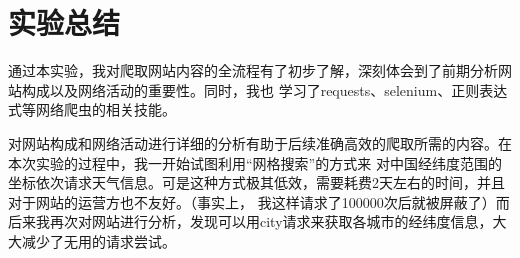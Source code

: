 \section{实验总结}
通过本实验，我对爬取网站内容的全流程有了初步了解，深刻体会到了前期分析网站构成以及网络活动的重要性。同时，我也
学习了requests、selenium、正则表达式等网络爬虫的相关技能。

对网站构成和网络活动进行详细的分析有助于后续准确高效的爬取所需的内容。在本次实验的过程中，我一开始试图利用“网格搜索”的方式来
对中国经纬度范围的坐标依次请求天气信息。可是这种方式极其低效，需要耗费2天左右的时间，并且对于网站的运营方也不友好。（事实上，
我这样请求了100000次后就被屏蔽了）而后来我再次对网站进行分析，发现可以用city请求来获取各城市的经纬度信息，大大减少了无用的请求尝试。


